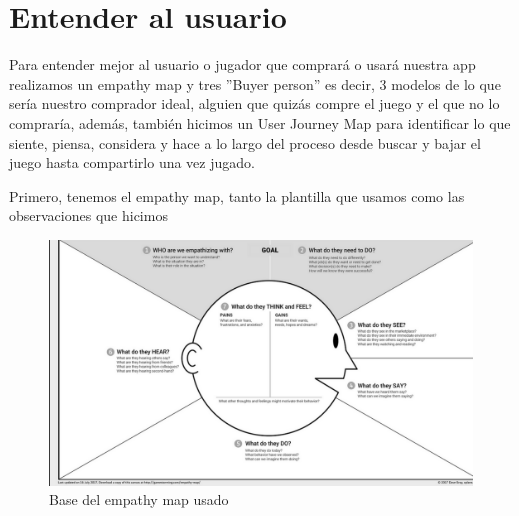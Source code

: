 \documentclass[12pt, oneside, letterpaper]{book}
\begin{document}
\chapter{Entender al usuario}
\par Para entender mejor al usuario o jugador que comprará o usará nuestra app realizamos un empathy map y tres ''Buyer person'' es decir, 3 modelos de lo que sería nuestro comprador ideal, alguien que quizás compre el juego y el que no lo compraría, además, también hicimos un User Journey Map para identificar lo que siente, piensa, considera y hace a lo largo del proceso desde buscar y bajar el juego hasta compartirlo una vez jugado.
\par 
Primero, tenemos el empathy map, tanto la plantilla que usamos como las observaciones que hicimos
\begin{figure}[h]
\includegraphics[width=1.2\columnwidth]{EMcaraFN.png}%
\caption{Base del empathy map usado }%
\label{BaseEMFN}%
\end{figure}
\end{document}
